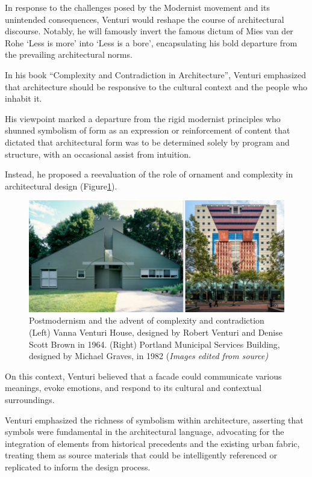 In response to the challenges posed by the Modernist movement and its unintended consequences, Venturi would reshape the course of architectural discourse.
Notably, he will famously invert the famous dictum of Mies van der Rohe ‘Less is more’ into ‘Less is a bore'\cite{Lutolli2020}, encapsulating his bold departure from the prevailing architectural norms.

In his book ``Complexity and Contradiction in Architecture''\cite{Venturi1977}, Venturi emphasized that architecture should be responsive to the cultural context and the people who inhabit it.

His viewpoint marked a departure from the rigid modernist principles who shunned symbolism of form as an expression or reinforcement of content that dictated that architectural form was to be determined solely by program and structure, with an  occasional  assist from  intuition\cite{Venturi1972}.

Instead, he proposed a reevaluation of the role of ornament and complexity in architectural design (Figure\ref{fig:postmodernfacade}).

     \begin{figure}[htb]
          \centering
          \includegraphics[width= \linewidth]{Images/PostmodernismVenturi}
          \caption{Postmodernism and the advent of complexity and contradiction (Left) Vanna Venturi House, designed by Robert Venturi and Denise Scott Brown in 1964. (Right) Portland Municipal Services Building, designed by Michael Graves, in 1982 (\textit{Images edited from source)}}
          \label{fig:postmodernfacade}
        \end{figure}

On this context, Venturi believed that a facade could communicate various meanings, evoke emotions, and respond to its cultural and contextual surroundings.

Venturi emphasized the richness of symbolism within architecture, asserting that symbols were fundamental in the architectural language, advocating for the integration of elements from historical precedents and the existing urban fabric, treating them as source materials that could be intelligently referenced or replicated to inform the design process\cite{Venturi1971}.

